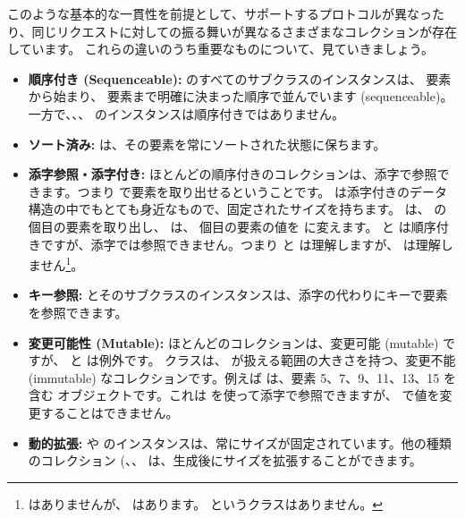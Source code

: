 \documentclass[a4paper,10pt,twoside]{book}
\begin{document}
このような基本的な一貫性を前提として、サポートするプロトコルが異なったり、同じリクエストに対しての振る舞いが異なるさまざまなコレクションが存在しています。
これらの違いのうち重要なものについて、見ていきましょう。

\begin{itemize}
  \item {\bf 順序付き (Sequenceable):}
   のすべてのサブクラスのインスタンスは、 要素から始まり、 要素まで明確に決まった順序で並んでいます (sequenceable)。
  一方で、\mbox{、}\mbox{、} のインスタンスは順序付きではありません。

  \item {\bf ソート済み:}
   は、その要素を常にソートされた状態に保ちます。

  \item {\bf 添字参照・添字付き:}
        ほとんどの順序付きのコレクションは、添字で参照できます。つまり  で要素を取り出せるということです。
         は添字付きのデータ構造の中でもとても身近なもので、固定されたサイズを持ちます。 は、 の  個目の要素を取り出し、 は、 個目の要素の値を  に変えます。
         と  は順序付きですが、添字では参照できません。つまり  と  は理解しますが、 は理解しません\footnote{ はありませんが、 はあります。 というクラスはありません。}。

  \item {\bf キー参照:}
	 とそのサブクラスのインスタンスは、添字の代わりにキーで要素を参照できます。

  \item {\bf 変更可能性 (Mutable):}
        ほとんどのコレクションは、変更可能 (mutable) ですが、 と  は例外です。
         クラスは、 が扱える範囲の大きさを持つ、変更不能 (immutable) なコレクションです。例えば は、要素 5、7、9、11、13、15 を含む  オブジェクトです。これは  を使って添字で参照できますが、 で値を変更することはできません。

  \item {\bf 動的拡張:}
          や  のインスタンスは、常にサイズが固定されています。他の種類のコレクション (、、 は、生成後にサイズを拡張することができます。


\end{itemize}
\end{document}
